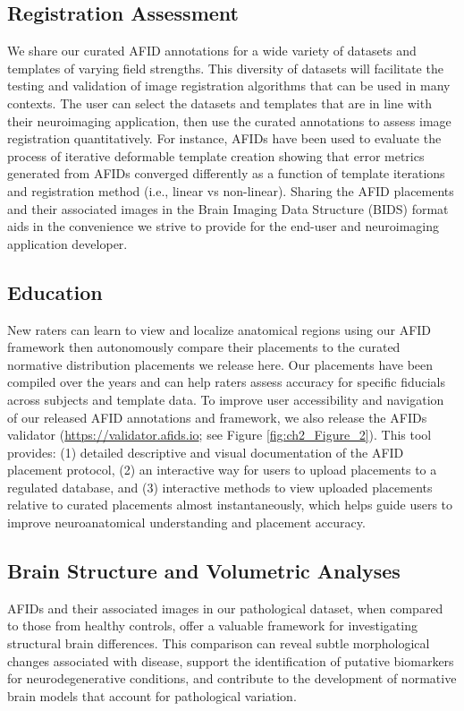 \subsection{Registration Assessment}
We share our curated AFID annotations for a wide variety of datasets and templates of varying field strengths. This diversity of datasets will facilitate the testing and validation of image registration algorithms that can be used in many contexts. The user can select the datasets and templates that are in line with their neuroimaging application, then use the curated annotations to assess image registration quantitatively. For instance, AFIDs have been used to evaluate the process of iterative deformable template creation \cite{Xiao2019-ao,Lau2020-dh} showing that error metrics generated from AFIDs converged differently as a function of template iterations and registration method (i.e., linear vs non-linear). Sharing the AFID placements and their associated images in the Brain Imaging Data Structure (BIDS) format aids in the convenience we strive to provide for the end-user and neuroimaging application developer.

\subsection{Education}
New raters can learn to view and localize anatomical regions using our AFID framework then autonomously compare their placements to the curated normative distribution placements we release here. Our placements have been compiled over the years and can help raters assess accuracy for specific fiducials across subjects and template data. To improve user accessibility and navigation of our released AFID annotations and framework, we also release the AFIDs validator (\url{https://validator.afids.io}; see Figure \ref{fig:ch2_Figure_2}). This tool provides: (1) detailed descriptive and visual documentation of the AFID placement protocol, (2) an interactive way for users to upload placements to a regulated database, and (3) interactive methods to view uploaded placements relative to curated placements almost instantaneously, which helps guide users to improve neuroanatomical understanding and placement accuracy.

\subsection{Brain Structure and Volumetric Analyses}
AFIDs and their associated images in our pathological dataset, when compared to those from healthy controls, offer a valuable framework for investigating structural brain differences. This comparison can reveal subtle morphological changes associated with disease, support the identification of putative biomarkers for neurodegenerative conditions, and contribute to the development of normative brain models that account for pathological variation.

